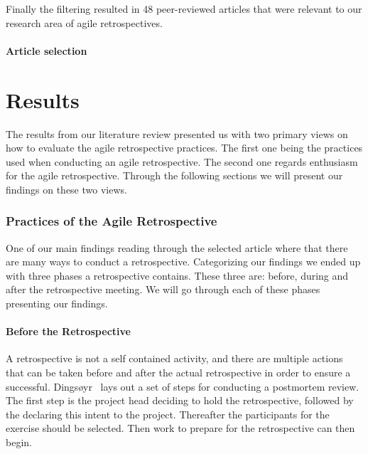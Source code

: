 \documentclass[12pt]{article}
\begin{document}
Finally the filtering resulted in 48 peer-reviewed articles that were relevant to our research area of agile retrospectives. 

\subsection{Article selection}

\clearpage

\part{Results}
The results from our literature review presented us with two primary views on how to evaluate the agile retrospective practices. The first one being the practices used when conducting an agile retrospective. The second one regards enthusiasm for the agile retrospective. Through the following sections we will present our findings on these two views. 

\section{Practices of the Agile Retrospective}
One of our main findings reading through the selected article where that there are many ways to conduct a retrospective. Categorizing our findings we ended up with three phases a retrospective contains. These three are: before, during and after the retrospective meeting. We will go through each of these phases presenting our findings.

\subsection{Before the Retrospective}
A retrospective is not a self contained activity, and there are multiple actions that can be taken before and after the actual retrospective in order to ensure a successful. Dingsøyr~\cite{Dingsoyr2005} lays out a set of steps for conducting a postmortem review. The first step is the project head deciding to hold the retrospective, followed by the declaring this intent to the project. Thereafter the participants for the exercise should be selected. Then work to prepare for the retrospective can then begin.
 
\end{document}
